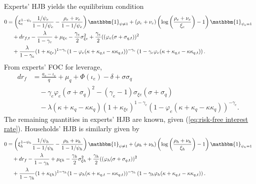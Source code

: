 \documentclass[12 pt, oneside]{article}
\theoremstyle{definition}
\theoremstyle{definition}
\theoremstyle{definition}
\begin{document}
Experts' HJB yields the equilibrium condition
\begin{equation}\label{eq:experts HJB eqcond}
\begin{split}
0      & = \left(\xi_e^{1 - \psi_e}\frac{1 / \psi_e}{1 - 1/\psi_e}  - \frac{\rho_e + \nu_e}{1 - 1 / \psi_e} \right)\mathbbm{1}_{\psi\neq 1} + (\rho_e + \nu_e)\left(\log\left(\frac{\rho_e + \nu_e}{\xi_e}\right) - 1\right)\mathbbm{1}_{\psi_e = 1}\\
    &\quad + dr_{f, t} - \frac{\lambda}{1 - \gamma_e} + \mu_{\xi e} - \frac{\gamma_e}{2}\sigma_{\xi e}^2 +\frac{\gamma_e}{2}((\varphi_e(\sigma + \sigma_{q, t}))^2\\
    &\quad + \frac{\lambda}{1 - \gamma_e}(1 + \kappa_{\xi e})^{1 - \gamma_e}(1 - \varphi_e(\kappa + \kappa_{q, t} - \kappa \kappa_{q, t}))^{ - \gamma_e}\left(1 - \gamma_e\varphi_e(\kappa + \kappa_{q, t} - \kappa\kappa_{q, t})\right).
\end{split}
\end{equation}
From experts' FOC for leverage,
\begin{equation}\label{eq:risk-free interest rate}
  \begin{split}
  dr_f & = \frac{a_e - \iota_e}{q} + \mu_q + \Phi(\iota_e) - \delta + \sigma\sigma_q\\
            &\quad - \gamma_e\varphi_e(\sigma + \sigma_q)^2 - (\gamma_e - 1)\sigma_{\xi e}(\sigma + \sigma_q)\\
            &\quad - \lambda(\kappa + \kappa_q - \kappa\kappa_q)(1 + \kappa_{\xi e})^{ 1- \gamma_e}(1 - \varphi_e (\kappa + \kappa_q - \kappa\kappa_q))^{ - \gamma_e}.
  \end{split}
\end{equation}
The remaining quantities in experts' HJB are known, given (\ref{eq:risk-free interest rate}). Households' HJB is similarly given by
\begin{equation}\label{eq:hh HJB eqcond}
  \begin{split}
    0      & = \left(\xi_h^{1 - \psi_h}\frac{1 / \psi_h}{1 - 1/\psi_h}  - \frac{\rho_h + \nu_h}{1 - 1 / \psi_h} \right)\mathbbm{1}_{\psi\neq 1} + (\rho_h + \nu_h)\left(\log\left(\frac{\rho_h + \nu_h}{\xi_h}\right) - 1\right)\mathbbm{1}_{\psi_h = 1}\\
    &\quad + dr_f - \frac{\lambda}{1 - \gamma_h} + \mu_{\xi h} - \frac{\gamma_h}{2}\sigma_{\xi h}^2 +\frac{\gamma_h}{2}((\varphi_h(\sigma + \sigma_{q, t}))^2\\
    &\quad + \frac{\lambda}{1 - \gamma_h}(1 + \kappa_{\xi h})^{1 - \gamma_h}(1 - \varphi_h(\kappa + \kappa_{q, t} - \kappa \kappa_{q, t}))^{ - \gamma_h}\left(1 - \gamma_h\varphi_h(\kappa + \kappa_{q, t} - \kappa\kappa_{q, t})\right).
  \end{split}
\end{equation}
\end{document}
